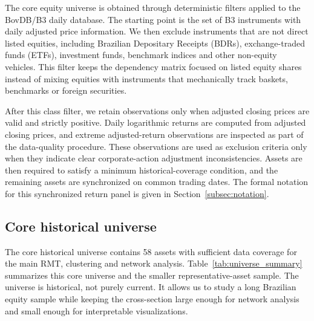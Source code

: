 The core equity universe is obtained through deterministic filters applied to the BovDB/B3 daily database. The starting point is the set of B3 instruments with daily adjusted price information. We then exclude instruments that are not direct listed equities, including Brazilian Depositary Receipts (BDRs), exchange-traded funds (ETFs), investment funds, benchmark indices and other non-equity vehicles. This filter keeps the dependency matrix focused on listed equity shares instead of mixing equities with instruments that mechanically track baskets, benchmarks or foreign securities.

After this class filter, we retain observations only when adjusted closing prices are valid and strictly positive. Daily logarithmic returns are computed from adjusted closing prices, and extreme adjusted-return observations are inspected as part of the data-quality procedure. These observations are used as exclusion criteria only when they indicate clear corporate-action adjustment inconsistencies. Assets are then required to satisfy a minimum historical-coverage condition, and the remaining assets are synchronized on common trading dates. The formal notation for this synchronized return panel is given in Section~\ref{subsec:notation}.

\subsection{Core historical universe}

The core historical universe contains 58 assets with sufficient data coverage for the main RMT, clustering and network analysis. Table~\ref{tab:universe_summary} summarizes this core universe and the smaller representative-asset sample. The universe is historical, not purely current. It allows us to study a long Brazilian equity sample while keeping the cross-section large enough for network analysis and small enough for interpretable visualizations.

\begin{center}
\label{tab:universe_summary}
\end{center}

